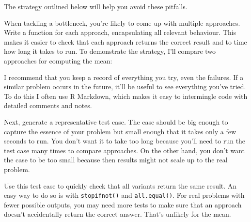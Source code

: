 The strategy outlined below will help you avoid these pitfalls.

When tackling a bottleneck, you're likely to come up with multiple
approaches. Write a function for each approach, encapsulating all
relevant behaviour. This makes it easier to check that each approach
returns the correct result and to time how long it takes to run. To
demonstrate the strategy, I'll compare two approaches for computing the
mean:

\begin{Shaded}
\begin{Highlighting}[]
\StringTok{ }
\StringTok{ }\StringTok{ }
\end{Highlighting}
\end{Shaded}

I recommend that you keep a record of everything you try, even the
failures. If a similar problem occurs in the future, it'll be useful to
see everything you've tried. To do this I often use R Markdown, which
makes it easy to intermingle code with detailed comments and notes.

Next, generate a representative test case. The case should be big enough
to capture the essence of your problem but small enough that it takes
only a few seconds to run. You don't want it to take too long because
you'll need to run the test case many times to compare approaches. On
the other hand, you don't want the case to be too small because then
results might not scale up to the real problem.

Use this test case to quickly check that all variants return the same
result. An easy way to do so is with \texttt{stopifnot()} and
\texttt{all.equal()}. For real problems with fewer possible outputs, you
may need more tests to make sure that an approach doesn't accidentally
return the correct answer. That's unlikely for the mean.

\begin{Shaded}
\begin{Highlighting}[]
\StringTok{ }\NormalTok{(}\NormalTok{)}
\NormalTok{(}\NormalTok{(}
\end{Highlighting}
\end{Shaded}

